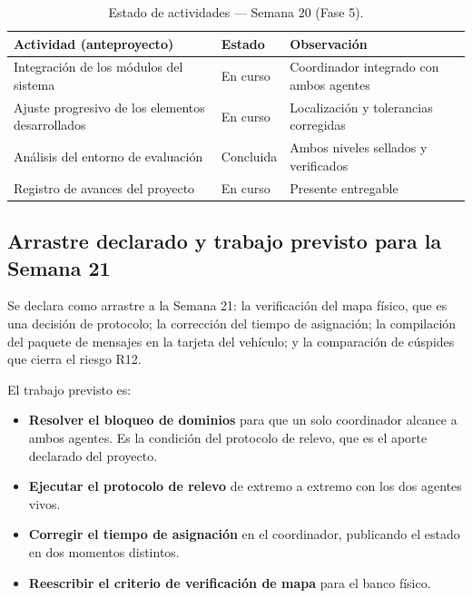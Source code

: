 \documentclass[12pt,letterpaper]{article}
\begin{document}
\begin{table}[H]
    \centering
    \small
    \caption{Estado de actividades --- Semana 20 (Fase 5).}
    \label{tab:estado_s20}
    \begin{tabular}{@{}p{6.3cm}ll@{}}
        \toprule
        \textbf{Actividad (anteproyecto)} & \textbf{Estado} & \textbf{Observación} \\ \midrule
        Integración de los módulos del sistema & En curso & Coordinador integrado con ambos agentes \\ \addlinespace
        Ajuste progresivo de los elementos desarrollados & En curso & Localización y tolerancias corregidas \\ \addlinespace
        Análisis del entorno de evaluación & Concluida & Ambos niveles sellados y verificados \\ \addlinespace
        Registro de avances del proyecto & En curso & Presente entregable \\ \bottomrule
    \end{tabular}
\end{table}

\subsection{Arrastre declarado y trabajo previsto para la Semana 21}

Se declara como arrastre a la Semana 21: la verificación del mapa físico, que es una decisión de protocolo; la corrección del tiempo de asignación; la compilación del paquete de mensajes en la tarjeta del vehículo; y la comparación de cúspides que cierra el riesgo R12.

El trabajo previsto es:

\begin{itemize}
    \item \textbf{Resolver el bloqueo de dominios} para que un solo coordinador alcance a ambos agentes. Es la condición del protocolo de relevo, que es el aporte declarado del proyecto.
    \item \textbf{Ejecutar el protocolo de relevo} de extremo a extremo con los dos agentes vivos.
    \item \textbf{Corregir el tiempo de asignación} en el coordinador, publicando el estado en dos momentos distintos.
    \item \textbf{Reescribir el criterio de verificación de mapa} para el banco físico.
\end{itemize}
\end{document}
